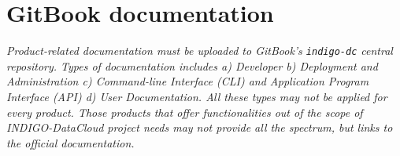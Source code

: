\section{GitBook documentation}
\footnotesize
\textit{Product-related documentation must be uploaded to GitBook's \texttt{indigo-dc} central repository. Types of documentation includes a) Developer b) Deployment and Administration c) Command-line Interface (CLI) and Application Program Interface (API) d) User Documentation. All these types may not be applied for every product. Those products that offer functionalities out of the scope of INDIGO-DataCloud project needs may not provide all the spectrum, but links to the official documentation.}
\\[0.3in]
\normalsize
